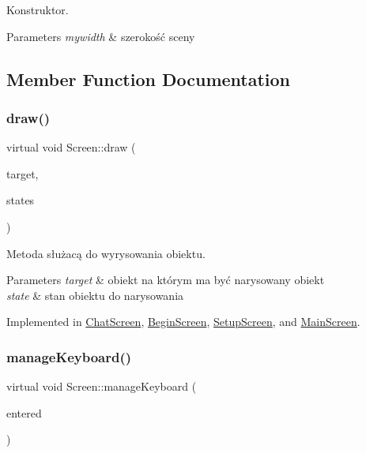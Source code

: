 Konstruktor. 


\begin{DoxyParams}{Parameters}
{\em mywidth} & szerokość sceny \\
\hline
\end{DoxyParams}


\subsection{Member Function Documentation}
\mbox{\label{class_screen_ab9f74bb4bf0d0ee2a8280354ba0ff85e}} 
\subsubsection{\texorpdfstring{draw()}{draw()}}
{\footnotesize\ttfamily virtual void Screen\+::draw (\begin{DoxyParamCaption}\item[{Render\+Target \&}]{target,  }\item[{Render\+States}]{states }\end{DoxyParamCaption})\hspace{0.3cm}{\ttfamily [pure virtual]}}



Metoda służacą do wyrysowania obiektu. 


\begin{DoxyParams}{Parameters}
{\em target} & obiekt na którym ma być narysowany obiekt \\
\hline
{\em state} & stan obiektu do narysowania \\
\hline
\end{DoxyParams}


Implemented in \mbox{\hyperlink{class_chat_screen_a87d8380e53cb84494ff03dd10f6d279c}{Chat\+Screen}}, \mbox{\hyperlink{class_begin_screen_a891ea875427d812284dce3ceb83839bc}{Begin\+Screen}}, \mbox{\hyperlink{class_setup_screen_a64ca86c7735fa3fc900cc0d5466c2d53}{Setup\+Screen}}, and \mbox{\hyperlink{class_main_screen_a4869b4bcd4bc03ef503904395bc4e68b}{Main\+Screen}}.

\mbox{\label{class_screen_a5b385381d2ba942567f4317e916c9951}} 
\subsubsection{\texorpdfstring{manageKeyboard()}{manageKeyboard()}}
{\footnotesize\ttfamily virtual void Screen\+::manage\+Keyboard (\begin{DoxyParamCaption}\item[{sf\+::\+Uint32}]{entered }\end{DoxyParamCaption})\hspace{0.3cm}{\ttfamily [pure virtual]}}



